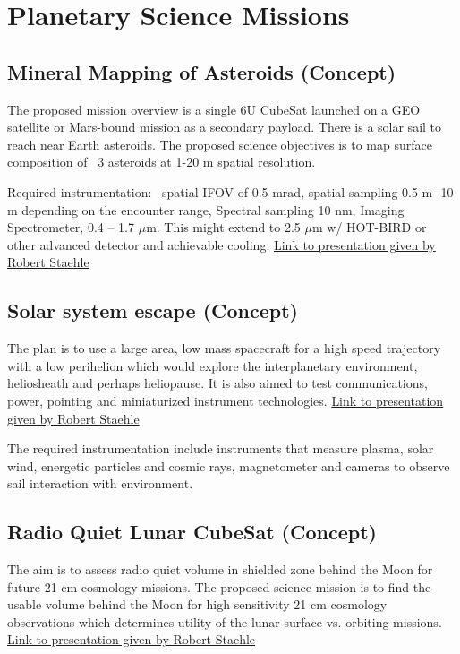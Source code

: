 \section{Planetary Science Missions}

\subsection{Mineral Mapping of Asteroids (Concept)}
The proposed mission overview is a single 6U CubeSat launched on a GEO satellite 
or Mars-bound mission as a secondary payload. There is a solar sail to reach near Earth asteroids. The proposed science objectives is to map surface composition of ~3 asteroids at 1-20 m spatial resolution.

Required instrumentation: ~spatial IFOV of 0.5 mrad, spatial sampling 0.5 m -10 m depending on the encounter range, Spectral sampling 10 nm, Imaging Spectrometer, 0.4 – 1.7 $\mu$m. This might extend to 2.5 $\mu$m w/ HOT-BIRD or other advanced detector and achievable cooling. \href{http://kiss.caltech.edu/cosponsored/cubesat2012/presentations/staehle-interplanetary-cubesat-missions.pdf}{Link to presentation given by Robert Staehle}

\subsection{Solar system escape (Concept)}
The plan is to use a large area, low mass spacecraft for a high speed trajectory with a low perihelion which would explore the interplanetary environment, heliosheath and perhaps heliopause. It is also aimed to test communications, power, pointing and miniaturized instrument technologies.  \href{http://kiss.caltech.edu/cosponsored/cubesat2012/presentations/staehle-interplanetary-cubesat-missions.pdf}{Link to presentation given by Robert Staehle}

The required instrumentation include instruments that measure plasma, solar wind, energetic particles and cosmic rays, magnetometer and cameras to observe sail interaction with environment.


\subsection{Radio Quiet Lunar CubeSat (Concept)}
The aim is to assess radio quiet volume in shielded zone behind the Moon for future 21 cm cosmology missions. The proposed science mission is to find the usable volume behind the Moon for high sensitivity 21 cm cosmology observations which determines utility of the lunar surface vs. orbiting missions.  \href{http://kiss.caltech.edu/cosponsored/cubesat2012/presentations/staehle-interplanetary-cubesat-missions.pdf}{Link to presentation given by Robert Staehle}

